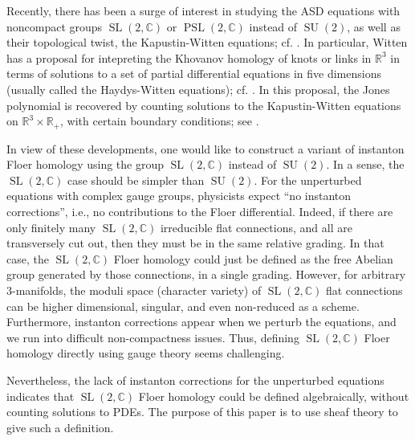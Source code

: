 \documentclass [11pt]{amsart}
\theoremstyle{remark}
\def\rr {{\mathbb{R}}}
\def\cc {{\mathbb{C}}}
\def\R{\rr}
\def\sl {{\operatorname{SL}(2, \cc)}}
\def\psl {{\operatorname{PSL}(2, \cc)}}
\def\su {{\operatorname{SU}(2)}}
\begin{document}
Recently, there has been a surge of interest in studying the ASD equations with noncompact groups $\sl$ or $\psl$ instead of $\su$, as well as their topological twist, the Kapustin-Witten equations; cf. \cite{KapustinWitten, Taubes3, Taubes4}. In particular, Witten has a proposal for intepreting the Khovanov homology of knots or links in $\R^3$ in terms of solutions to a set of partial differential equations in five dimensions (usually called the Haydys-Witten equations); cf. \cite{FiveBranes, Haydys}. In this proposal, the Jones polynomial is recovered by counting solutions to the Kapustin-Witten equations on $\R^3 \times \R_+$, with certain boundary conditions; see \cite{FiveBranes, GaiottoWitten, WittenLectures1, WittenLectures2}.

In view of these developments, one would like to construct a variant of instanton Floer homology using the group $\sl$ instead of $\su$. In a sense, the $\sl$ case should be simpler than $\su$. For the unperturbed equations with complex gauge groups, physicists expect ``no instanton corrections'', i.e., no contributions to the Floer differential. Indeed, if there are only finitely many $\sl$ irreducible flat connections, and all are transversely cut out, then they must be in the same relative grading. In that case, the $\sl$ Floer homology could just be defined as the free Abelian group generated by those connections, in a single grading. However, for arbitrary $3$-manifolds, the moduli space (character variety) of $\sl$ flat connections can be higher dimensional, singular, and even non-reduced as a scheme. Furthermore, instanton corrections appear when we perturb the equations, and we run into difficult non-compactness issues. Thus, defining $\sl$ Floer homology directly using gauge theory seems challenging. 

Nevertheless, the lack of instanton corrections for the unperturbed equations indicates that $\sl$ Floer homology could be defined algebraically, without counting solutions to PDEs. The purpose of this paper is to use sheaf theory to give such a definition. 
\end{document}
